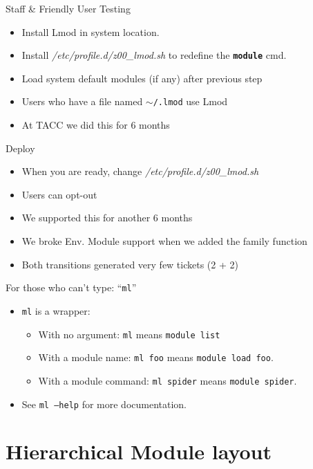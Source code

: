 \documentclass{beamer}
\begin{document}
\begin{frame}{Staff \& Friendly User Testing}
  \begin{itemize}
    \item Install Lmod in system location.
    \item Install \emph{/etc/profile.d/z00\_lmod.sh} to redefine the
      \texttt{\bf module} cmd.
    \item Load system  default modules (if any) after previous step
    \item Users who have a file named \texttt{$\sim$/.lmod} use Lmod
    \item At TACC we did this for 6 months
  \end{itemize}
\end{frame}

\begin{frame}{Deploy}
  \begin{itemize}
    \item When you are ready, change \emph{/etc/profile.d/z00\_lmod.sh}
    \item Users can opt-out
    \item We supported this for another 6 months
    \item We broke Env. Module support when we added the family function
    \item Both transitions generated very few tickets (2 + 2)
  \end{itemize}
\end{frame}

\begin{frame}{For those who can't type: ``\texttt{ml}''}
  \begin{itemize}
    \item \texttt{ml} is a wrapper:
      \begin{itemize}
        \item With no argument: \texttt{ml} means \texttt{module list}
        \item With a module name: \texttt{ml foo} means \texttt{module
            load foo}.
        \item With a module command: \texttt{ml spider} means
          \texttt{module spider}.
      \end{itemize}
    \item See \texttt{ml --help} for more documentation.
  \end{itemize}
\end{frame}

\section{Hierarchical Module layout}
\end{document}
